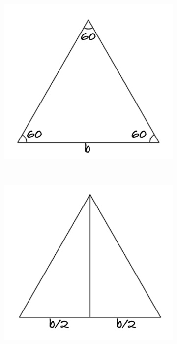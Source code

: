 \documentclass[12pt,letter]{article}
\begin{document}
\begin{figure}[h]
	\caption{Area of Equilateral Triangle Constructions}
	\centering
	\begin{subfigure}[h]{0.3\textwidth}
		\includegraphics[width=\textwidth]{equil_tri_a.pdf}
		\caption{}
		\label{fig:equil_tri_a}
	\end{subfigure}
	~
	\begin{subfigure}[h]{0.3\textwidth}
		\includegraphics[width=\textwidth]{equil_tri_b.pdf}

\end{subfigure}
\end{figure}
\end{document}
